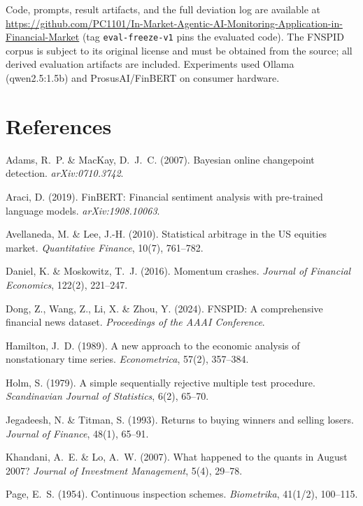 \documentclass[10pt,a4paper]{article}
\begin{document}
Code, prompts, result artifacts, and the full deviation log are available at
\url{https://github.com/PC1101/In-Market-Agentic-AI-Monitoring-Application-in-Financial-Market}
(tag \texttt{eval-freeze-v1} pins the evaluated code). The FNSPID corpus is
subject to its original license and must be obtained from the source; all
derived evaluation artifacts are included. Experiments used Ollama
(qwen2.5:1.5b) and ProsusAI/FinBERT on consumer hardware.

\section*{References}

\begin{description}[font=\normalfont, leftmargin=1.5em, labelindent=0em, itemsep=0pt]
\item Adams, R.~P. \& MacKay, D.~J.~C. (2007). Bayesian online changepoint
  detection. \emph{arXiv:0710.3742}.
\item Araci, D. (2019). FinBERT: Financial sentiment analysis with pre-trained
  language models. \emph{arXiv:1908.10063}.
\item Avellaneda, M. \& Lee, J.-H. (2010). Statistical arbitrage in the US
  equities market. \emph{Quantitative Finance}, 10(7), 761--782.
\item Daniel, K. \& Moskowitz, T.~J. (2016). Momentum crashes. \emph{Journal
  of Financial Economics}, 122(2), 221--247.
\item Dong, Z., Wang, Z., Li, X. \& Zhou, Y. (2024). FNSPID: A comprehensive
  financial news dataset. \emph{Proceedings of the AAAI Conference}.
\item Hamilton, J.~D. (1989). A new approach to the economic analysis of
  nonstationary time series. \emph{Econometrica}, 57(2), 357--384.
\item Holm, S. (1979). A simple sequentially rejective multiple test
  procedure. \emph{Scandinavian Journal of Statistics}, 6(2), 65--70.
\item Jegadeesh, N. \& Titman, S. (1993). Returns to buying winners and
  selling losers. \emph{Journal of Finance}, 48(1), 65--91.
\item Khandani, A.~E. \& Lo, A.~W. (2007). What happened to the quants in
  August 2007? \emph{Journal of Investment Management}, 5(4), 29--78.
\item Page, E.~S. (1954). Continuous inspection schemes. \emph{Biometrika},
  41(1/2), 100--115.
\end{description}
\end{document}
